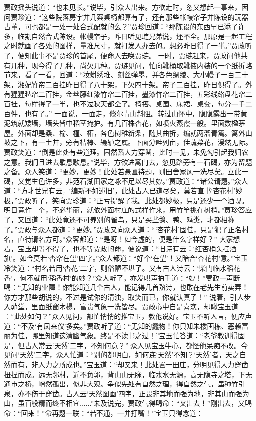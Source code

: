\documentclass[12pt,oneside]{book}
\begin{document}
贾政摇头说道：“也未见长。”说毕，引众人出来。方欲走时，忽又想起一事来，因问贾珍道：“这些院落房宇并几案桌椅都算有了，还有那些帐幔帘子并陈设的玩器古董，可也都是一处一处合式配就的么？”贾珍回道：“那陈设的东西早已添了许多，临期自然合式陈设。帐幔帘子，昨日听见琏兄弟说，还不全。那原是一起工程之时就画了各处的图样，量准尺寸，就打发人办去的。想必昨日得了一半。”贾政听了，便知此事不是贾珍的首尾，便命人去唤贾琏。
一时，贾琏赶来，贾政问他共有几种，现今得了几种，尚欠几种。贾琏见问，忙向靴桶取靴掖内装的一个纸折略节来，看了一看，回道：“妆蟒绣堆、刻丝弹墨，并各色绸绫、大小幔子一百二十架，湘妃竹帘二百挂昨日得了八十架，下欠四十架。帘子二百挂，昨日俱得了。外有猩猩毡帘二百挂，金丝藤红漆竹帘二百挂，墨漆竹帘二百挂，五彩线络盘花帘二百挂，每样得了一半，也不过秋天都全了。椅搭、桌围、床裙、桌套，每分一千二百件，也有了。”
一面说，一面走，倏尔青山斜阻。转过山怀中，隐隐露出一带黄泥筑就矮墙，墙头皆中稻茎掩护。有几百株杏花，如喷火蒸霞一般。里面数楹茅屋。外面却是桑、榆、槿、柘，各色树稚新条，随其曲折，编就两溜青篱。篱外山坡之下，有一土井，旁有桔槔、辘轳之属。下面分畦列亩，佳蔬菜花，漫然无际。
贾政笑道：“倒是此处有些道理。固然系人力穿凿，此时一见，未免勾引起我归农之意。我们且进去歇息歇息。”说毕，方欲进篱门去，忽见路旁有一石碣，亦为留题之备。众人笑道：“更妙，更妙！此处若悬匾待题，则田舍家风一洗尽矣。立此一碣，又觉生色许多，非范石湖田家之咏不足以尽其妙。”贾政道：“诸公请题。”众人道：“方才世兄有云，‘编新不如述旧’，此处古人已道尽矣，莫若直书‘杏花村’妙极，”贾政听了，笑向贾珍道：“正亏提醒了我。此处都妙极，只是还少一个酒幌。明日竟作一个，不必华丽，就依外面村庄的式样作来，用竹竿挑在树梢。”贾珍答应了，又回道：“此处竟还不可养别的雀鸟，只是买些鹅、鸭、鸡类，才都相称了。”贾政与众人都道：“更妙。”贾政又向众人道：“‘杏花村’固佳，只是犯了正名村名，直待请名方可。”众客都道：“是呀！如今虚的，便是什么字样好？”
大家想着，宝玉却等不得了，也不等贾政的命，便说道：“旧诗有云：‘红杏梢头挂酒旗’。如今莫若‘杏帘在望’四字。”众人都道：“好个‘在望’！又暗合‘杏花村’意。”宝玉冷笑道：“村名若用‘杏花’二字，则俗陋不堪了。又有古人诗云：‘柴门临水稻花香’，何不就用‘稻香村’的妙？”众人听了，亦发哄声拍手道：“妙！”贾政一声断喝：“无知的业障！你能知道几个古人，能记得几首熟诗，也敢在老先生前卖弄！你方才那些胡说的，不过是试你的清浊，取笑而已，你就认真了！”
说着，引人步入茆堂，里面纸窗木榻，富贵气象一洗皆尽。贾政心中自是喜欢，却瞅宝玉道︰“此处如何？”众人见问，都忙悄悄的推宝玉，教他说好。宝玉不听人言，便应声道：“不及‘有凤来仪’多矣。”贾政听了道：“无知的蠢物！你只知朱楼画栋、恶赖富丽为佳，哪里知道这清幽气象。终是不读书之过！”宝玉忙答道：“老爷教训得固是，但古人常云‘天然’二字，不知何意？”
众人见宝玉牛心，都怪他呆痴不改。今见问‘天然’二字，众人忙道：“别的都明白，如何连‘天然’不知？‘天然’者，天之自然而有，非人力之所成也。”宝玉道：“却又来！此处置一田庄，分明见得人力穿凿扭捏而成。远无邻村，近不负郭，背山山无脉，临水水无源，高无隐寺之塔，下无通市之桥，峭然孤出，似非大观。争似先处有自然之理，得自然之气，虽种竹引泉，亦不伤于穿凿。古人云‘天然图画’四字，正畏非其地而强为地，非其山而强为山，虽百般精而终不相宜......”未及说完，贾政气得喝命：“叉出去！”刚出去，又喝命：“回来！”命再题一联：“若不通，一并打嘴！”宝玉只得念道：
\end{document}
